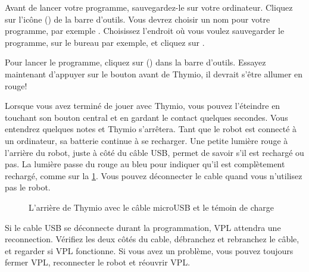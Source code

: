 
Avant de lancer votre programme, sauvegardez-le sur votre ordinateur.
Cliquez sur l'icône  () de la barre d'outils.
Vous devrez choisir un nom pour votre programme, par exemple .
Choisissez l'endroit où vous voulez sauvegarder le programme, sur le bureau par exemple, et cliquez sur .



Pour lancer le programme, cliquez sur  () dans la barre d'outils.
Essayez maintenant d'appuyer sur le bouton avant de Thymio, il devrait s'être allumer en rouge!



Lorsque vous avez terminé de jouer avec Thymio, vous pouvez l'éteindre en touchant son bouton central et en gardant le contact quelques secondes.
Vous entendrez quelques notes et Thymio s'arrêtera.
Tant que le robot est connecté à un ordinateur, sa batterie continue à se recharger. Une petite lumière rouge à l'arrière du robot, juste à côté du câble USB, permet de savoir s'il est rechargé ou pas. La lumière passe du rouge au bleu pour indiquer qu'il est complètement rechargé, comme sur la \cref{fig.back}.
Vous pouvez déconnecter le cable quand vous n'utilisez pas le robot.


\begin{figure}
\begin{center}
\caption{L'arrière de Thymio avec le câble microUSB et le témoin de charge}\label{fig.back}
\end{center}
\end{figure}

Si le cable USB se déconnecte durant la programmation, VPL attendra une reconnection.
Vérifiez les deux côtés du cable, débranchez et rebranchez le câble, et regarder si VPL fonctionne.
Si vous avez un problème, vous pouvez toujours fermer VPL, reconnecter le robot et réouvrir VPL.

